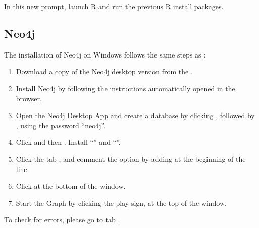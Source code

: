 \documentclass[letterpaper,10pt,english]{sphinxmanual}
\begin{document}
In this new prompt, launch R and run the previous R install packages.


\subsection{Neo4j}
\label{\detokenize{intro/getting-started-with-windows:neo4j}}
The installation of Neo4j on Windows follows the same steps as {\hyperref[\detokenize{intro/getting-started-with-neo4j:getting-started-with-neo4j}]{}}:
\begin{enumerate}
%
\item {} 
Download a copy of the Neo4j desktop version from the .

\item {} 
Install Neo4j by following the instructions automatically opened in the browser.

\item {} 
Open the Neo4j Desktop App and create a database by clicking , followed by , using the password “neo4j”.

\item {} 
Click  and then . Install “” and “”.

\item {} 
Click the tab , and comment the option  by adding \sphinxcode{\sphinxupquote{\#}} at the beginning of the line.

\item {} 
Click  at the bottom of the window.

\item {} 
Start the Graph by clicking the play sign, at the top of the window.

\end{enumerate}

To check for errors, please go to tab .
\end{document}

